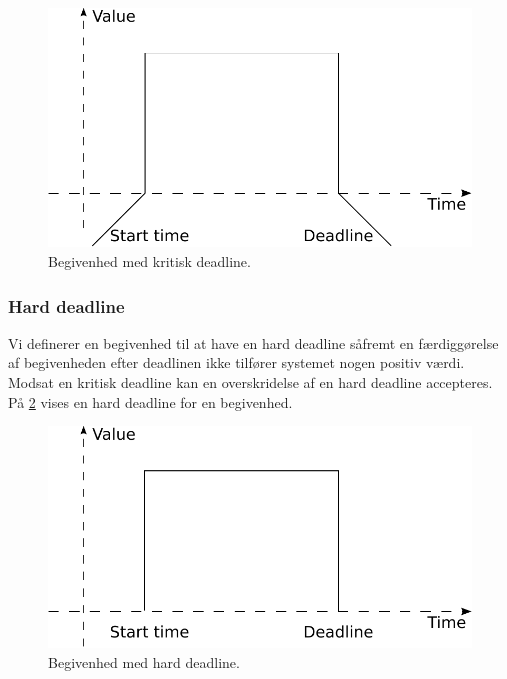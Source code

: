\begin{figure}
 \begin{center}
  \includegraphics[scale=0.75]{images/critical-deadline}
	\caption{Begivenhed med kritisk deadline.}
	\label{fig:hard-rtp}
\end{center}
\end{figure}


\subsubsection{Hard deadline}
Vi definerer en begivenhed til at have en hard deadline såfremt en færdiggørelse af begivenheden efter deadlinen ikke tilfører systemet nogen positiv værdi. Modsat en kritisk deadline kan en overskridelse af en hard deadline accepteres. På \cref{fig:hard-dl} vises en hard deadline for en begivenhed. 

\begin{figure}
 \begin{center}
  \includegraphics[scale=0.75]{images/hard-deadline}
	\caption{Begivenhed med hard deadline.}
	\label{fig:hard-dl}
\end{center}
\end{figure}

